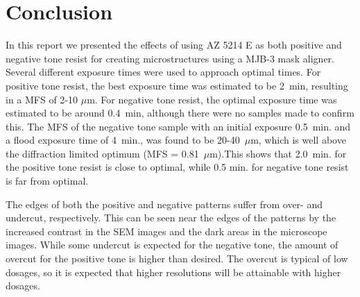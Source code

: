 \section*{Conclusion}
In this report we presented the effects of using AZ 5214 E as both positive and negative tone resist for creating microstructures using a MJB-3 mask aligner. Several different exposure times were used to approach optimal times. For positive tone resist, the best exposure time was estimated to be 2~min, resulting in a MFS of 2-10 $\mu$m. For negative tone resist, the optimal exposure time was estimated to be around 0.4~min, although there were no samples made to confirm this. The MFS of the negative tone sample with an initial exposure 0.5~min. and a flood exposure time of 4~min., was found to be 20-40~$\mu$m, which is well above the diffraction limited optimum (MFS = 0.81~$\mu$m).This shows that 2.0~min. for the positive tone resist is close to optimal, while 0.5 min. for negative tone resist is far from optimal. 

The edges of both the positive and negative patterns suffer from over- and undercut, respectively. This can be seen near the edges of the patterns by the increased contrast in the SEM images and the dark areas in the microscope images. While some undercut is expected for the negative tone, the amount of overcut for the positive tone is higher than desired. The overcut is typical of low dosages, so it is expected that higher resolutions will be attainable with higher dosages.